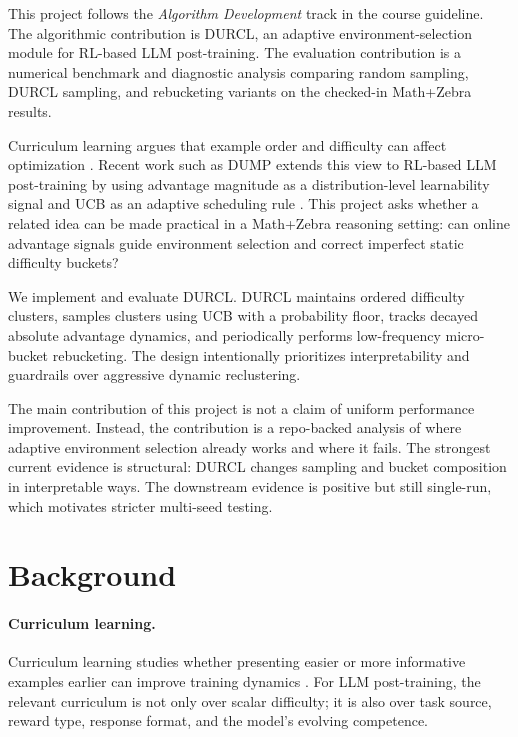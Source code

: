 \documentclass[10pt]{article}
\begin{document}
This project follows the \emph{Algorithm Development} track in the course guideline. The algorithmic contribution is DURCL, an adaptive environment-selection module for RL-based LLM post-training. The evaluation contribution is a numerical benchmark and diagnostic analysis comparing random sampling, DURCL sampling, and rebucketing variants on the checked-in Math+Zebra results.

Curriculum learning argues that example order and difficulty can affect optimization \citep{bengio2009curriculum}. Recent work such as DUMP extends this view to RL-based LLM post-training by using advantage magnitude as a distribution-level learnability signal and UCB as an adaptive scheduling rule \citep{wang2025dump}. This project asks whether a related idea can be made practical in a Math+Zebra reasoning setting: can online advantage signals guide environment selection and correct imperfect static difficulty buckets?

We implement and evaluate DURCL. DURCL maintains ordered difficulty clusters, samples clusters using UCB with a probability floor, tracks decayed absolute advantage dynamics, and periodically performs low-frequency micro-bucket rebucketing. The design intentionally prioritizes interpretability and guardrails over aggressive dynamic reclustering.

The main contribution of this project is not a claim of uniform performance improvement. Instead, the contribution is a repo-backed analysis of where adaptive environment selection already works and where it fails. The strongest current evidence is structural: DURCL changes sampling and bucket composition in interpretable ways. The downstream evidence is positive but still single-run, which motivates stricter multi-seed testing.

\section{Background}

\paragraph{Curriculum learning.}
Curriculum learning studies whether presenting easier or more informative examples earlier can improve training dynamics \citep{bengio2009curriculum}. For LLM post-training, the relevant curriculum is not only over scalar difficulty; it is also over task source, reward type, response format, and the model's evolving competence.
\end{document}
